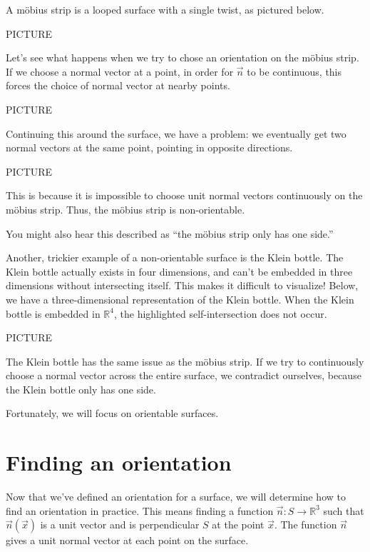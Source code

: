 \documentclass{ximera}
\begin{document}
\begin{example}
A m\"{o}bius strip is a looped surface with a single twist, as pictured below.

PICTURE

Let's see what happens when we try to chose an orientation on the m\"{o}bius strip. If we choose a normal vector at a point, in order for $\vec{n}$ to be continuous, this forces the choice of normal vector at nearby points.

PICTURE

Continuing this around the surface, we have a problem: we eventually get two normal vectors at the same point, pointing in opposite directions.

PICTURE

This is because it is impossible to choose unit normal vectors continuously on the m\"{o}bius strip. Thus, the m\"{o}bius strip is non-orientable.

You might also hear this described as ``the m\"{o}bius strip only has one side.''
\end{example}

\begin{example}
Another, trickier example of a non-orientable surface is the Klein bottle. The Klein bottle actually exists in four dimensions, and can't be embedded in three dimensions without intersecting itself. This makes it difficult to visualize! Below, we have a three-dimensional representation of the Klein bottle. When the Klein bottle is embedded in $\mathbb{R}^4$, the highlighted self-intersection does not occur.

PICTURE

The Klein bottle has the same issue as the m\"{o}bius strip. If we try to continuously choose a normal vector across the entire surface, we contradict ourselves, because the Klein bottle only has one side.
\end{example}

Fortunately, we will focus on orientable surfaces.

\section*{Finding an orientation}

Now that we've defined an orientation for a surface, we will determine how to find an orientation in practice. This means finding a function $\vec{n}:S\rightarrow\mathbb{R}^3$ such that $\vec{n}(\vec{x})$ is a unit vector and is perpendicular $S$ at the point $\vec{x}$. The function $\vec{n}$ gives a unit normal vector at each point on the surface.
\end{document}
